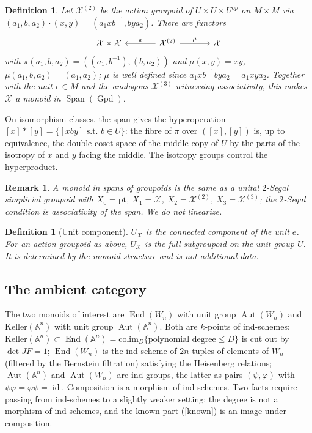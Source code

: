 \documentclass[11pt]{article}
\theoremstyle{change}
\newtheorem{definition}[equation]{Definition}
\newtheorem{remark}[equation]{Remark}
\theoremstyle{nonumberplain}
\renewcommand\AA{{\mathbb A}}
\newcommand\cX{{\mathcal X}}
\newcommand\st{{\textrm{ s.t.\ }}}
\newcommand\setof[1]{\{ #1 \}}
\DeclareMathOperator{\End}{End}
\DeclareMathOperator{\Aut}{Aut}
\DeclareMathOperator{\id}{id}
\DeclareMathOperator{\Gpd}{Gpd}
\DeclareMathOperator{\Span}{Span}
\begin{document}
\begin{definition}\label{spanmon}
Let $\cX^{(2)}$ be the action groupoid of $U \times U \times U^{op}$ on $M \times M$ via $(a_1, b, a_2) \cdot (x, y) = (a_1 x b^{-1}, b y a_2)$. There are functors
\begin{equation*}
\begin{tikzcd}[column sep=large]
\cX \times \cX & \cX^{(2)} \arrow[l, "\pi"'] \arrow[r, "\mu"] & \cX
\end{tikzcd}
\end{equation*}
with $\pi(a_1,b,a_2) = ((a_1, b^{-1}), (b, a_2))$ and $\mu(x,y) = xy$, $\mu(a_1,b,a_2) = (a_1,a_2)$; $\mu$ is well defined since $a_1 x b^{-1} b y a_2 = a_1 xy a_2$. Together with the unit $e \in M$ and the analogous $\cX^{(3)}$ witnessing associativity, this makes $\cX$ a \emph{monoid in $\Span(\Gpd)$}.
\end{definition}

On isomorphism classes, the span gives the hyperoperation $[x] * [y] = \setof{[x b y] \st b \in U}$: the fibre of $\pi$ over $([x],[y])$ is, up to equivalence, the double coset space of the middle copy of $U$ by the parts of the isotropy of $x$ and $y$ facing the middle. The isotropy groups control the hyperproduct.

\begin{remark}
A monoid in spans of groupoids is the same as a unital $2$-Segal simplicial groupoid \cite{DK} with $X_0 = \mathrm{pt}$, $X_1 = \cX$, $X_2 = \cX^{(2)}$, $X_3 = \cX^{(3)}$; the $2$-Segal condition is associativity of the span. We do not linearize.
\end{remark}

\begin{definition}[Unit component]
$U_\cX$ is the connected component of the unit $e$. For an action groupoid as above, $U_\cX$ is the full subgroupoid on the unit group $U$. It is determined by the monoid structure and is not additional data.
\end{definition}

\subsection{The ambient category}

The two monoids of interest are $\End(W_n)$ with unit group $\Aut(W_n)$ and $\mathrm{Keller}(\AA^n)$ with unit group $\Aut(\AA^n)$. Both are $k$-points of ind-schemes: $\mathrm{Keller}(\AA^n) \subset \End(\AA^n) = \mathrm{colim}_D \setof{\text{polynomial degree} \leq D}$ is cut out by $\det JF = 1$; $\End(W_n)$ is the ind-scheme of $2n$-tuples of elements of $W_n$ (filtered by the Bernstein filtration) satisfying the Heisenberg relations; $\Aut(\AA^n)$ and $\Aut(W_n)$ are ind-groups, the latter as pairs $(\psi,\varphi)$ with $\psi\varphi = \varphi\psi = \id$. Composition is a morphism of ind-schemes. Two facts require passing from ind-schemes to a slightly weaker setting: the degree is not a morphism of ind-schemes, and the known part (\cref{known}) is an image under composition.
\end{document}
